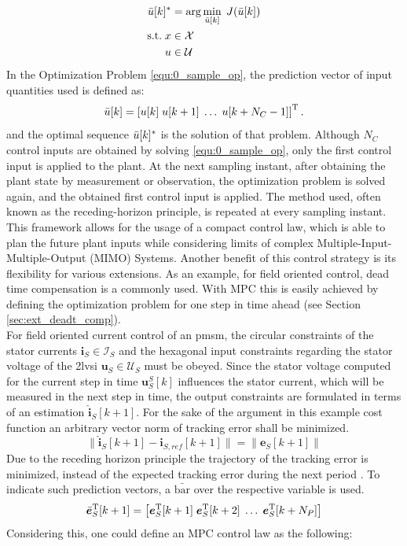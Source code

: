 \begin{equation}
    \begin{split}
            \Bar{u}[k]^* &= \arg \min_{\Bar{u}[k]}\; J(\bar{u}[k])\\
	 \text{s.t.} \;x&\in \mathcal{X}\\
     u &\in \mathcal{U}
    \end{split}
    \label{equ:0_sample_op}
\end{equation}
In the Optimization Problem \eqref{equ:0_sample_op}, the prediction vector of input quantities used is defined as: 
\[
\Bar{u}[k] = \left[ u[k] \; u[k+1] \; \hdots \; u[k+N_C-1]   \right]^{\mathrm{T}}.
\]
and the optimal sequence $\Bar{u}[k]^* $ is the solution of that problem. Although $N_C$ control inputs are obtained by solving \eqref{equ:0_sample_op}, only the first control input is applied to the plant. At the next sampling instant, after obtaining the plant state by measurement or observation, the optimization problem is solved again, and the obtained first control input is applied. The method used, often known as the receding-horizon principle, is repeated at every sampling instant.\\
This framework allows for the usage of a compact control law, which is able to plan the future plant inputs while considering limits of complex Multiple-Input-Multiple-Output (MIMO) Systems. Another benefit of this control strategy is its flexibility for various extensions. As an example, for field oriented control, dead time compensation is a commonly used. With MPC this is easily achieved by defining the optimization problem for one step in time ahead (see Section \ref{sec:ext_deadt_comp}). \\
For field oriented current control of an \acrshort{pmsm}, the circular constraints of the stator currents $\boldsymbol{i}_{S} \in \mathcal{I}_S$ and the hexagonal input constraints regarding the stator voltage of the \acrshort{2lvsi} $\boldsymbol{u}_{S} \in \mathcal{U}_S$ must be obeyed. Since the stator voltage computed for the current step in time $\boldsymbol{u}_{S}^S[k]$ influences the stator current, which will be measured in the next step in time, the output constraints are formulated in terms of an estimation $\hat{\boldsymbol{i}}_{S}[k+1]$. For the sake of the argument in this example cost function an arbitrary vector norm of tracking error shall be minimized.
\[
\|\hat{\boldsymbol{i}}_{S}[k+1] -\boldsymbol{i}_{S,ref}[k+1]\| = \|\boldsymbol{e}_S[k+1]\| 
\]
Due to the receding horizon principle the trajectory of the tracking error is minimized, instead of the expected tracking error during the next period . To indicate such prediction vectors, a $\bar{\text{bar}}$ over the respective variable is used. 
\[
\Bar{\bm e}_S^{\mathrm{T}}[k+1] = \left[ \bm{e}_S^{\mathrm{T}}[k+1] \; \bm{e}_S^{\mathrm{T}}[k+2] \; \hdots \; \bm{e}_S^{\mathrm{T}}[k+N_P]   \right]
\]
Considering this, one could define an MPC control law as the following:

